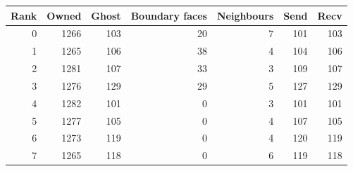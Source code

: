 \begin{tabular}{rrrrrrr}
\toprule
Rank & Owned & Ghost & Boundary faces & Neighbours & Send & Recv \\
\midrule
\num{0} & \num{1266} & \num{103} & \num{20} & \num{7} & \num{101} & \num{103} \\
\num{1} & \num{1265} & \num{106} & \num{38} & \num{4} & \num{104} & \num{106} \\
\num{2} & \num{1281} & \num{107} & \num{33} & \num{3} & \num{109} & \num{107} \\
\num{3} & \num{1276} & \num{129} & \num{29} & \num{5} & \num{127} & \num{129} \\
\num{4} & \num{1282} & \num{101} & \num{0} & \num{3} & \num{101} & \num{101} \\
\num{5} & \num{1277} & \num{105} & \num{0} & \num{4} & \num{107} & \num{105} \\
\num{6} & \num{1273} & \num{119} & \num{0} & \num{4} & \num{120} & \num{119} \\
\num{7} & \num{1265} & \num{118} & \num{0} & \num{6} & \num{119} & \num{118} \\
\bottomrule
\end{tabular}

